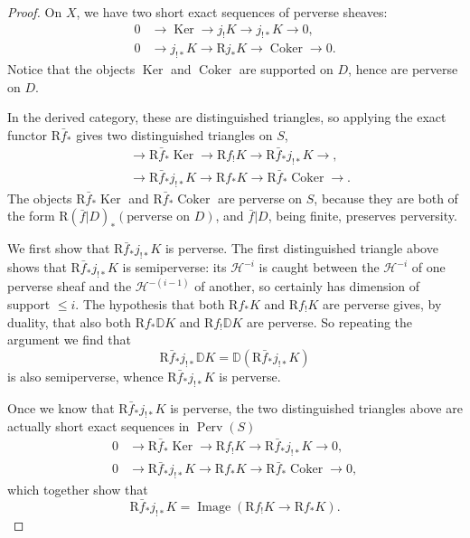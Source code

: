 \begin{proof}
On \(X\), we have two short exact sequences of perverse sheaves:
\[
  \begin{aligned}
    0 &\to \operatorname{Ker}\to j_!K\to j_{!*}K\to 0,\\
    0 &\to j_{!*}K\to \mathrm{R}j_*K\to \operatorname{Coker}\to 0.
  \end{aligned}
\]
Notice that the objects \(\operatorname{Ker}\) and \(\operatorname{Coker}\)
are supported on \(D\), hence are perverse on \(D\).

In the derived category, these are distinguished triangles, so applying the
exact functor \(\mathrm{R}\bar{f}_*\) gives two distinguished triangles on
\(S\),
\[
  \begin{aligned}
    &\to \mathrm{R}\bar{f}_*\operatorname{Ker}
      \to \mathrm{R}f_!K
      \to \mathrm{R}\bar{f}_*j_{!*}K\to,\\
    &\to \mathrm{R}\bar{f}_*j_{!*}K
      \to \mathrm{R}f_*K
      \to \mathrm{R}\bar{f}_*\operatorname{Coker}\to.
  \end{aligned}
\]
The objects \(\mathrm{R}\bar{f}_*\operatorname{Ker}\) and
\(\mathrm{R}\bar{f}_*\operatorname{Coker}\) are perverse on \(S\), because
they are both of the form \(\mathrm{R}(\bar{f}|D)_*(\text{perverse on }D)\),
and \(\bar{f}|D\), being finite, preserves perversity.

We first show that \(\mathrm{R}\bar{f}_*j_{!*}K\) is perverse. The first
distinguished triangle above shows that \(\mathrm{R}\bar{f}_*j_{!*}K\) is
semiperverse: its \(\mathcal{H}^{-i}\) is caught between the
\(\mathcal{H}^{-i}\) of one perverse sheaf and the \(\mathcal{H}^{-(i-1)}\)
of another, so certainly has dimension of support \(\leq i\). The hypothesis
that both \(\mathrm{R}f_*K\) and \(\mathrm{R}f_!K\) are perverse gives, by
duality, that also both \(\mathrm{R}f_*\mathbb{D}K\) and
\(\mathrm{R}f_!\mathbb{D}K\) are perverse. So repeating the argument we find
that
\[
  \mathrm{R}\bar{f}_*j_{!*}\mathbb{D}K
  =
  \mathbb{D}(\mathrm{R}\bar{f}_*j_{!*}K)
\]
is also semiperverse, whence \(\mathrm{R}\bar{f}_*j_{!*}K\) is perverse.

Once we know that \(\mathrm{R}\bar{f}_*j_{!*}K\) is perverse, the two
distinguished triangles above are actually short exact sequences in
\(\operatorname{Perv}(S)\)
\[
  \begin{aligned}
    0 &\to \mathrm{R}\bar{f}_*\operatorname{Ker}
      \to \mathrm{R}f_!K
      \to \mathrm{R}\bar{f}_*j_{!*}K\to 0,\\
    0 &\to \mathrm{R}\bar{f}_*j_{!*}K
      \to \mathrm{R}f_*K
      \to \mathrm{R}\bar{f}_*\operatorname{Coker}\to 0,
  \end{aligned}
\]
which together show that
\[
  \mathrm{R}\bar{f}_*j_{!*}K
  =
  \operatorname{Image}(\mathrm{R}f_!K\to \mathrm{R}f_*K).
\]
\end{proof}

